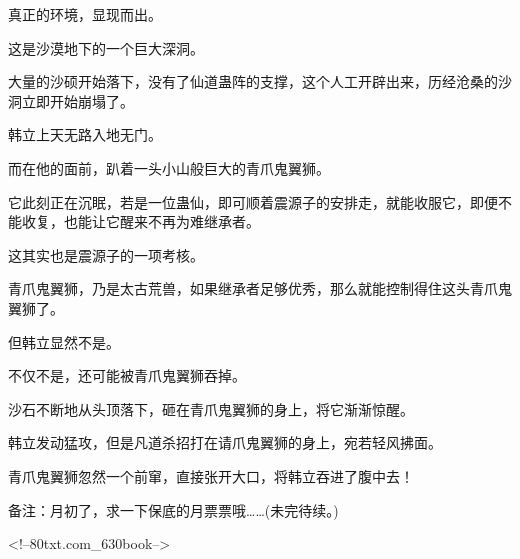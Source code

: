 \begin{this_body}
真正的环境，显现而出。

这是沙漠地下的一个巨大深洞。

大量的沙硕开始落下，没有了仙道蛊阵的支撑，这个人工开辟出来，历经沧桑的沙洞立即开始崩塌了。

韩立上天无路入地无门。

而在他的面前，趴着一头小山般巨大的青爪鬼翼狮。

它此刻正在沉眠，若是一位蛊仙，即可顺着震源子的安排走，就能收服它，即便不能收复，也能让它醒来不再为难继承者。

这其实也是震源子的一项考核。

青爪鬼翼狮，乃是太古荒兽，如果继承者足够优秀，那么就能控制得住这头青爪鬼翼狮了。

但韩立显然不是。

不仅不是，还可能被青爪鬼翼狮吞掉。

沙石不断地从头顶落下，砸在青爪鬼翼狮的身上，将它渐渐惊醒。

韩立发动猛攻，但是凡道杀招打在请爪鬼翼狮的身上，宛若轻风拂面。

青爪鬼翼狮忽然一个前窜，直接张开大口，将韩立吞进了腹中去！

备注：月初了，求一下保底的月票票哦……(未完待续。)

<!--80txt.com\_630book-->

\end{this_body}

